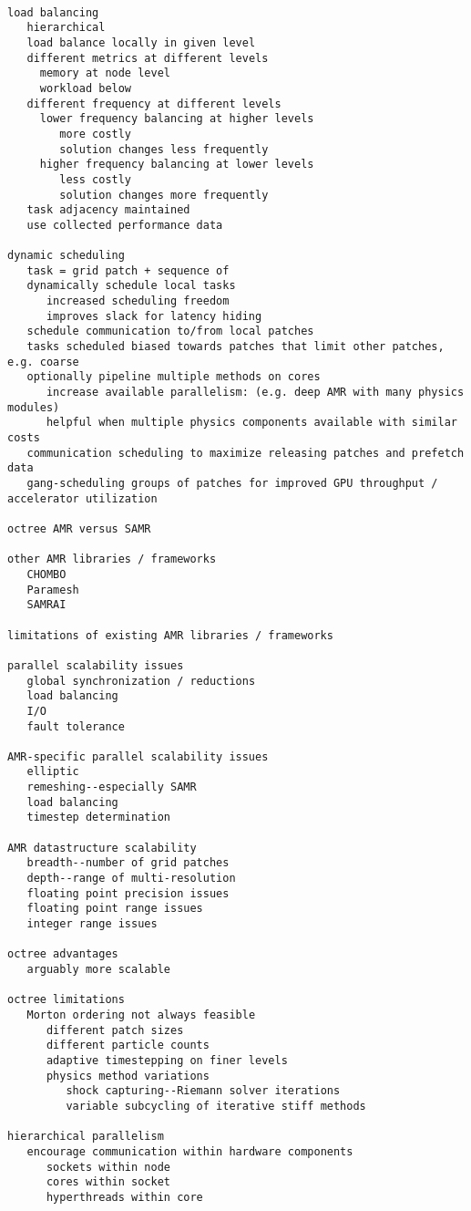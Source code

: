 \documentclass[14pt]{article}
\begin{document}
\begin{verbatim}

load balancing
   hierarchical
   load balance locally in given level
   different metrics at different levels
     memory at node level
     workload below
   different frequency at different levels
     lower frequency balancing at higher levels
        more costly
        solution changes less frequently
     higher frequency balancing at lower levels
        less costly
        solution changes more frequently
   task adjacency maintained
   use collected performance data

dynamic scheduling
   task = grid patch + sequence of 
   dynamically schedule local tasks
      increased scheduling freedom
      improves slack for latency hiding
   schedule communication to/from local patches
   tasks scheduled biased towards patches that limit other patches, e.g. coarse
   optionally pipeline multiple methods on cores
      increase available parallelism: (e.g. deep AMR with many physics modules)
      helpful when multiple physics components available with similar costs
   communication scheduling to maximize releasing patches and prefetch data
   gang-scheduling groups of patches for improved GPU throughput / accelerator utilization

octree AMR versus SAMR   

other AMR libraries / frameworks
   CHOMBO
   Paramesh
   SAMRAI

limitations of existing AMR libraries / frameworks

parallel scalability issues
   global synchronization / reductions
   load balancing
   I/O
   fault tolerance

AMR-specific parallel scalability issues
   elliptic
   remeshing--especially SAMR
   load balancing
   timestep determination

AMR datastructure scalability
   breadth--number of grid patches
   depth--range of multi-resolution
   floating point precision issues
   floating point range issues
   integer range issues

octree advantages
   arguably more scalable

octree limitations
   Morton ordering not always feasible
      different patch sizes
      different particle counts
      adaptive timestepping on finer levels
      physics method variations
         shock capturing--Riemann solver iterations
         variable subcycling of iterative stiff methods

hierarchical parallelism
   encourage communication within hardware components
      sockets within node
      cores within socket
      hyperthreads within core


\end{verbatim}
\end{document}
